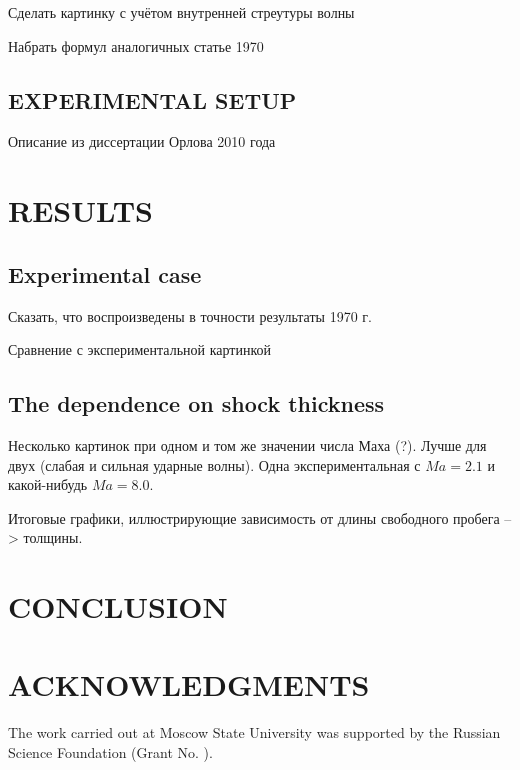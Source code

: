 \documentclass{aip-cp}
\begin{document}
Сделать картинку с учётом внутренней стреутуры волны

Набрать формул аналогичных статье 1970

\subsection{EXPERIMENTAL SETUP}

Описание из диссертации Орлова 2010 года

\section{RESULTS}
\subsection{Experimental case}

Сказать, что воспроизведены в точности результаты 1970 г. 

Сравнение с экспериментальной картинкой 

\subsection{The dependence on shock thickness}

Несколько картинок при одном и том же значении числа Маха (?). Лучше для двух (слабая и сильная ударные волны). Одна экспериментальная с $Ma=2.1$ и какой-нибудь $Ma=8.0$.

Итоговые графики, иллюстрирующие зависимость от длины свободного пробега --> толщины.

\section{CONCLUSION}

\section{ACKNOWLEDGMENTS}
The work carried out at Moscow State University was supported by the Russian Science Foundation (Grant No. ).


\nocite{*}
%
%
\end{document}
